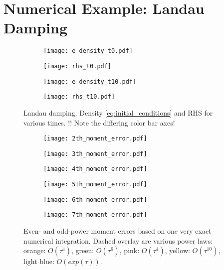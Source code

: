 
\section{Numerical Example: Landau Damping}\label{sec:landau}

\begin{figure}
    \centering
    \begin{subfigure}{0.45\textwidth}
        \texttt{[image: e\_density\_t0.pdf]}
    \end{subfigure}
    \begin{subfigure}{0.45\textwidth}
        \texttt{[image: rhs\_t0.pdf]}
    \end{subfigure}
    \begin{subfigure}{0.45\textwidth}
        \texttt{[image: e\_density\_t10.pdf]}
    \end{subfigure}
    \begin{subfigure}{0.45\textwidth}
        \texttt{[image: rhs\_t10.pdf]}
    \end{subfigure}
    \caption{
        Landau damping. Density \ref{eq:initial_conditions} and RHS for various times. 
        !! Note the differing color bar axes!
    }\label{fig:density}
\end{figure}

\begin{figure}
    \centering
    \begin{subfigure}{0.45\textwidth}
        \texttt{[image: 2th\_moment\_error.pdf]}
    \end{subfigure}
    \begin{subfigure}{0.45\textwidth}
        \texttt{[image: 3th\_moment\_error.pdf]}
    \end{subfigure}
    \begin{subfigure}{0.45\textwidth}
        \texttt{[image: 4th\_moment\_error.pdf]}
    \end{subfigure}
    \begin{subfigure}{0.45\textwidth}
        \texttt{[image: 5th\_moment\_error.pdf]}
    \end{subfigure}
    \begin{subfigure}{0.45\textwidth}
        \texttt{[image: 6th\_moment\_error.pdf]}
    \end{subfigure}
    \begin{subfigure}{0.45\textwidth}
        \texttt{[image: 7th\_moment\_error.pdf]}
    \end{subfigure}
    \caption{
        Even- and odd-power moment errors based on one very exact numerical integration. 
        Dashed overlay are various power laws: orange: $O(\tau^4)$, green: $O(\tau^6)$, pink: 
        $O(\tau^4)$, yellow: $O(\tau^10)$, light blue: $O(exp(\tau))$. 
    }\label{fig:moments}
\end{figure}

